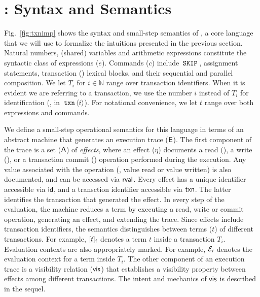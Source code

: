\section{\txnimp: Syntax and Semantics}
\label{sec:opsem}

\label{sec:syntax}



Fig.~\ref{fig:txnimp} shows the syntax and small-step semantics of
\txnimp, a core language that we will use to formalize the intuitions
presented in the previous section. Natural numbers, (shared) variables
and arithmetic expressions constitute the syntactic class of
expressions ($e$).  Commands ($c$) include $\,{\tt SKIP}\,$, assignment
statements, transaction () lexical blocks, and their sequential
and parallel composition. We let $T_i$ for $i \in \mathbb{N}$ range
over transaction identifiers. When it is evident we are referring to a
transaction, we use the number $i$ instead of $T_i$ for identification
(\eg, in $\,{\tt txn}\,\langle i \rangle$). For notational convenience, we
let $t$ range over both expressions and commands.

We define a small-step operational semantics for this language in
terms of an abstract machine that generates an execution trace
($\textsf{E}$). The first component of the trace is a set ($\textsf{A}$) of
\emph{effects}, where an effect ($\eta$) documents a read (),
a write (), or a transaction commit () operation
performed during the execution. Any value associated with the
operation (\eg, value read or value written) is also documented, and
can be accessed via $\textsf{rval}$. Every effect has a unique identifier
accessible via $\textsf{id}$, and a transction identifier accessible via
$\textsf{txn}$.  The latter identifies the transaction that generated the
effect. In every step of the evaluation, the machine reduces a \txnimp
term by executing a read, write or commit operation, generating an
effect, and extending the trace. Since effects include transaction
identifiers, the semantics distinguishes between terms ($t$) of
different transactions. For example, $\lbrack t \rbrack_i$ denotes a term $t$
inside a transaction $T_i$.  Evaluation contexts are also
appropriately marked. For example, $\mathcal{E}_i$ denotes the evaluation
context for a term inside $T_i$. The other component of an execution
trace is a visibility relation ($\textsf{vis}$) that establishes a visibility
property between effects among different transactions. The intent and
mechanics of $\textsf{vis}$ is described in the sequel.


